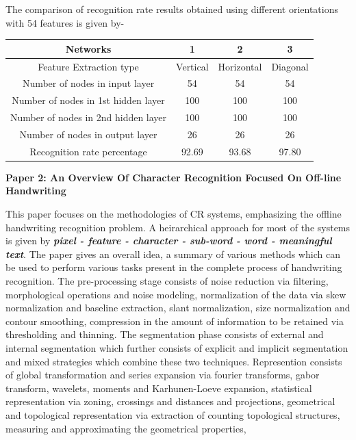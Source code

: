 \documentclass[main.tex]{subfiles}
\begin{document}
The comparison of recognition rate results obtained using different orientations
with 54 features is given by-
\begin{center}
	\begin{tabular}{|c|c|c|c|}
\hline
Networks & 1 & 2 & 3 \\
\hline
Feature Extraction type & Vertical & Horizontal & Diagonal \\
\hline
Number of nodes in input layer & 54 & 54 & 54 \\
\hline
Number of nodes in 1st hidden layer & 100 & 100 & 100 \\
\hline
Number of nodes in 2nd hidden layer & 100 & 100 & 100 \\
\hline
Number of nodes in output layer & 26 & 26 & 26 \\
\hline
Recognition rate percentage & 92.69 & 93.68 & 97.80 \\
\hline
\end{tabular}
\end{center}
\vspace{5mm}
\begin{flushleft}
\bf{Paper 2: An Overview Of Character Recognition Focused On Off-line
	Handwriting}
\end{flushleft}
\vspace{1.5mm}
This paper focuses on the methodologies of CR systems, emphasizing the offline
handwriting recognition problem. A heirarchical approach for most of the systems
is given by \textbf{\textit{pixel - feature - character - sub-word - word -
meaningful text}}. The paper gives an overall idea, a summary of various methods
which can be used to perform various tasks present in the complete process of
handwriting recognition. The pre-processing stage consists of noise reduction via
filtering, morphological operations and noise modeling, normalization  of the
data via skew normalization and baseline extraction, slant normalization, size
normalization and contour smoothing, compression in the amount of information to
be retained via thresholding and thinning. The segmentation phase consists of
external and internal segmentation which further consists of explicit and
implicit segmentation and mixed strategies which combine these two techniques.
Represention consists of global transformation and series expansion via fourier
transforms, gabor transform, wavelets, moments and Karhunen-Loeve expansion,
statistical representation via zoning, crossings and distances and projections,
geometrical and topological representation via extraction of counting
topological structures, measuring and approximating the geometrical properties,
\end{document}
